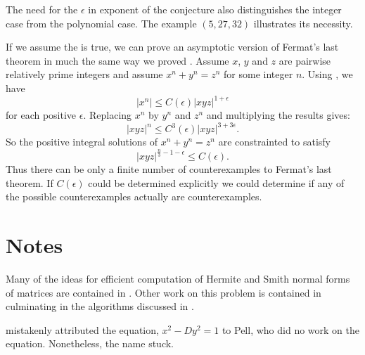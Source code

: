The need for the $\epsilon$ in exponent of the conjecture also
distinguishes the integer case from the polynomial case.  The example
$(5, 27, 32)$ illustrates its necessity.

If we assume the {\ABCconj} is true, we can prove an asymptotic
version of Fermat's last theorem in much the same way we proved
.  Assume $x$, $y$ and $z$ are pairwise
relatively prime integers and assume $x^n + y^n = z^n$ for some
integer $n$.  Using , we have
\[
|x^n| \le C(\epsilon) |xyz|^{1+\epsilon} 
\]
for each positive $\epsilon$.
Replacing $x^n$ by $y^n$ and $z^n$ and multiplying the results gives:
\[
|xyz|^n \le C^3(\epsilon) |xyz|^{3+3\epsilon}.
\]
So the positive integral solutions of $x^n + y^n = z^n$ are
constrainted to satisfy
\[
|xyz|^{\frac{n}{3}-1-\epsilon} \le C(\epsilon).
\]
Thus there can be only a finite number of counterexamples to Fermat's
last theorem.  If $C(\epsilon)$ could be determined explicitly we
could determine if any of the possible counterexamples actually are
counterexamples.  


\section*{Notes}

\small


  Many of the ideas for efficient
computation of Hermite and Smith normal forms of matrices are
contained in \cite{Havas1979-vf}.  Other work on this problem is contained
in \cite{Bradley1971-ix,Kannan1979-rv,Chou1982-zq,Domich1985-dz} culminating in
the algorithms discussed in \cite{Iliopoulos1989-jx,Iliopoulos1989-vn}.

 {\Lagrange} mistakenly attributed the
equation, $x^2 - Dy^2 = 1$ to Pell, who did no work on the equation.
Nonetheless, the name stuck.

